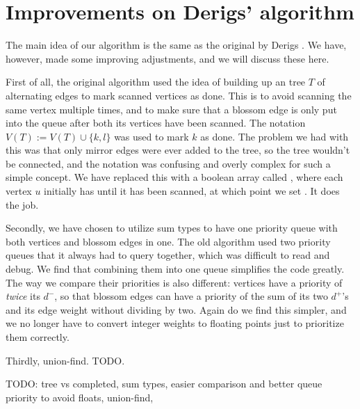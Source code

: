 \section{Improvements on Derigs' algorithm}
The main idea of our algorithm is the same as the original by Derigs \cite{derigs_shortest_odd_path}. We have, however, made some improving adjustments, and we will discuss these here.

First of all, the original algorithm used the idea of building up an tree $T$ of alternating edges to mark scanned vertices as done. This is to avoid scanning the same vertex multiple times, and to make sure that a blossom edge is only put into the queue after both its vertices have been scanned. The notation $V(T) := V(T) \cup \{k,l\}$ was used to mark $k$ as done. The problem we had with this was that only mirror edges were ever added to the tree, so the tree wouldn't be connected, and the notation was confusing and overly complex for such a simple concept. We have replaced this with a boolean array called , where each vertex $u$ initially has  until it has been scanned, at which point we set . It does the job.

Secondly, we have chosen to utilize sum types to have one priority queue with both vertices and blossom edges in one. The old algorithm used two priority queues that it always had to query together, which was difficult to read and debug. We find that combining them into one queue simplifies the code greatly. The way we compare their priorities is also different: vertices have a priority of \emph{twice} its $d^-$, so that blossom edges can have a priority of the sum of its two $d^+$'s and its edge weight without dividing by two. Again do we find this simpler, and we no longer have to convert integer weights to floating points just to prioritize them correctly.

Thirdly, union-find. TODO.

TODO: tree vs completed, sum types, easier comparison and better queue priority to avoid floats, union-find, 